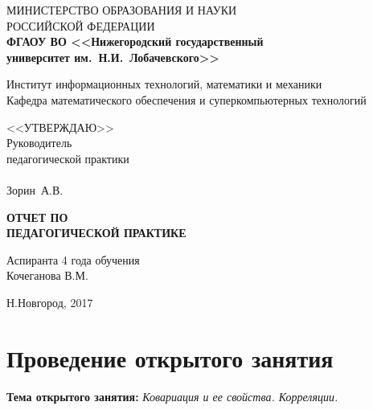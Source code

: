 \documentclass[14pt]{extarticle}
\theoremstyle{theorem}
\theoremstyle{remark}
\begin{document}
\begin{titlepage}

  \begin{center}
  {
    {МИНИСТЕРСТВО ОБРАЗОВАНИЯ И НАУКИ \\РОССИЙСКОЙ ФЕДЕРАЦИИ} }\\
    {
    \textbf{%
    {ФГАОУ ВО 
      <<Нижегородский государственный\\ университет им.~Н.И.~Лобачевского>>}
    }
    }

 \medskip

 
   { Институт информационных технологий, математики и механики }\\
    Кафедра математического обеспечения и суперкомпьютерных технологий

    
 \medskip
  \medskip
   \medskip \medskip
    \medskip
     \medskip
      \medskip
     \hfill
    \begin{minipage}[h]{ 0.33\linewidth}
    <<УТВЕРЖДАЮ>>\\
    Руководитель \\
    педагогической практики\\
\\
    \underline{\hspace{3cm}} Зорин~А.В.
    \end{minipage}
   \medskip \medskip
    \medskip
     \medskip
      \medskip
   \medskip \medskip
    \medskip
     \medskip
      \medskip
      
    \textbf{ОТЧЕТ  ПО}\\ \textbf{ПЕДАГОГИЧЕСКОЙ ПРАКТИКЕ}\\
 \medskip

    
         \medskip
      \medskip
               \medskip
      \medskip
    \hfill
    \begin{minipage}[h]{ 0.5\linewidth}
    Аспиранта 4 года обучения\\
    Кочеганова В.М.
    \end{minipage}
    \vfill {Н.Новгород, 2017}
  \end{center}
\end{titlepage}

\tableofcontents
\newpage

\section{Проведение открытого занятия}

  \medskip
\textbf{Тема открытого занятия:} \textit{Ковариация и ее свойства. Корреляции.}
\end{document}
